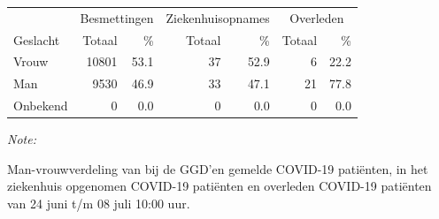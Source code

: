 \documentclass[
  english,
  man,floatsintext]{apa6}
\begin{document}
\begin{table}
\centering\begingroup\fontsize{11}{13}\selectfont

\begin{threeparttable}
\begin{tabular}{lrrrrrr}
\toprule
\multicolumn{1}{c}{ } & \multicolumn{2}{c}{Besmettingen} & \multicolumn{2}{c}{Ziekenhuisopnames} & \multicolumn{2}{c}{Overleden} \\
\cmidrule(l{3pt}r{3pt}){2-3} \cmidrule(l{3pt}r{3pt}){4-5} \cmidrule(l{3pt}r{3pt}){6-7}
Geslacht & Totaal & \% & Totaal & \% & Totaal & \%\\
\midrule
Vrouw & 10801 & 53.1 & 37 & 52.9 & 6 & 22.2\\
Man & 9530 & 46.9 & 33 & 47.1 & 21 & 77.8\\
Onbekend & 0 & 0.0 & 0 & 0.0 & 0 & 0.0\\
\bottomrule
\end{tabular}
\begin{tablenotes}
\item \textit{Note: } 
\item Man-vrouwverdeling van bij de GGD’en gemelde COVID-19 patiënten, in het ziekenhuis opgenomen COVID-19 patiënten en overleden COVID-19 patiënten van 24 juni t/m 08 juli 10:00 uur.
\end{tablenotes}
\end{threeparttable}
\endgroup{}
\end{table}
\newpage
\end{document}

